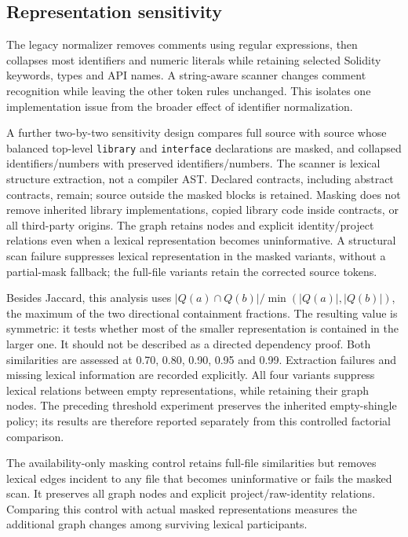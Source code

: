 \documentclass[preprint,12pt]{elsarticle}
\begin{document}
\subsection{Representation sensitivity}\label{representation-sensitivity}

The legacy normalizer removes comments using regular expressions, then collapses most identifiers and numeric literals while retaining selected Solidity keywords, types and API names. A string-aware scanner changes comment recognition while leaving the other token rules unchanged. This isolates one implementation issue from the broader effect of identifier normalization.

A further two-by-two sensitivity design compares full source with source whose balanced top-level \texttt{library} and \texttt{interface} declarations are masked, and collapsed identifiers/numbers with preserved identifiers/numbers. The scanner is lexical structure extraction, not a compiler AST. Declared contracts, including abstract contracts, remain; source outside the masked blocks is retained. Masking does not remove inherited library implementations, copied library code inside contracts, or all third-party origins. The graph retains nodes and explicit identity/project relations even when a lexical representation becomes uninformative. A structural scan failure suppresses lexical representation in the masked variants, without a partial-mask fallback; the full-file variants retain the corrected source tokens.

Besides Jaccard, this analysis uses \(|Q(a)\cap Q(b)|/\min(|Q(a)|,|Q(b)|)\), the maximum of the two directional containment fractions. The resulting value is symmetric: it tests whether most of the smaller representation is contained in the larger one. It should not be described as a directed dependency proof. Both similarities are assessed at 0.70, 0.80, 0.90, 0.95 and 0.99. Extraction failures and missing lexical information are recorded explicitly. All four variants suppress lexical relations between empty representations, while retaining their graph nodes. The preceding threshold experiment preserves the inherited empty-shingle policy; its results are therefore reported separately from this controlled factorial comparison.

The availability-only masking control retains full-file similarities but removes lexical edges incident to any file that becomes uninformative or fails the masked scan. It preserves all graph nodes and explicit project/raw-identity relations. Comparing this control with actual masked representations measures the additional graph changes among surviving lexical participants.
\end{document}
